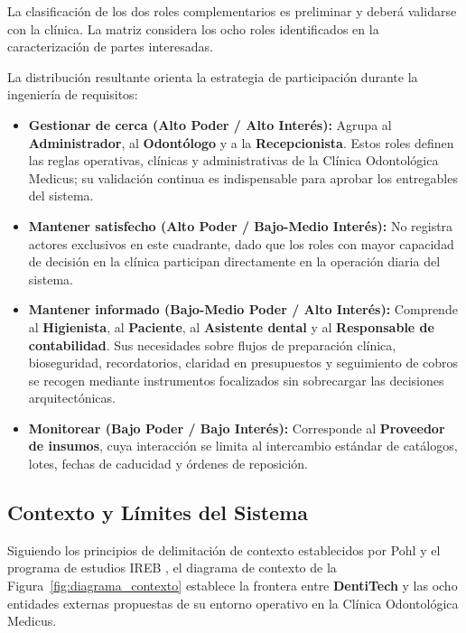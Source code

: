 \documentclass[12pt,a4paper]{article}
\begin{document}
La clasificación de los dos roles complementarios es preliminar y deberá validarse con la clínica. La matriz considera los ocho roles identificados en la caracterización de partes interesadas.

La distribución resultante orienta la estrategia de participación durante la ingeniería de requisitos:

\begin{itemize}
    \item \textbf{Gestionar de cerca (Alto Poder / Alto Interés):} Agrupa al \textbf{Administrador}, al \textbf{Odontólogo} y a la \textbf{Recepcionista}. Estos roles definen las reglas operativas, clínicas y administrativas de la Clínica Odontológica Medicus; su validación continua es indispensable para aprobar los entregables del sistema.

    \item \textbf{Mantener satisfecho (Alto Poder / Bajo-Medio Interés):} No registra actores exclusivos en este cuadrante, dado que los roles con mayor capacidad de decisión en la clínica participan directamente en la operación diaria del sistema.

    \item \textbf{Mantener informado (Bajo-Medio Poder / Alto Interés):} Comprende al \textbf{Higienista}, al \textbf{Paciente}, al \textbf{Asistente dental} y al \textbf{Responsable de contabilidad}. Sus necesidades sobre flujos de preparación clínica, bioseguridad, recordatorios, claridad en presupuestos y seguimiento de cobros se recogen mediante instrumentos focalizados sin sobrecargar las decisiones arquitectónicas.

    \item \textbf{Monitorear (Bajo Poder / Bajo Interés):} Corresponde al \textbf{Proveedor de insumos}, cuya interacción se limita al intercambio estándar de catálogos, lotes, fechas de caducidad y órdenes de reposición.
\end{itemize}

\subsection{Contexto y Límites del Sistema}

Siguiendo los principios de delimitación de contexto establecidos por Pohl \cite{pohl2025} y el programa de estudios IREB \cite{ireb2026}, el diagrama de contexto de la Figura~\ref{fig:diagrama_contexto} establece la frontera entre \textbf{DentiTech} y las ocho entidades externas propuestas de su entorno operativo en la Clínica Odontológica Medicus.
\end{document}
